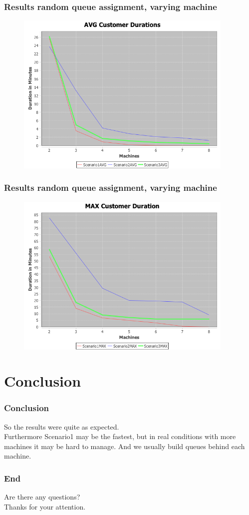 \documentclass{beamer}
\begin{document}
\begin{frame}
\frametitle{Results random queue assignment, varying machine}
\begin{figure}
\centering
\includegraphics[width=0.93\textwidth]{results/Output_AVG_random_true.png}
\end{figure}
\end{frame}

\begin{frame}
\frametitle{Results random queue assignment, varying machine}
\begin{figure}
\centering
\includegraphics[width=0.93\textwidth]{results/Output_MAX_random_true.png}
\end{figure}
\end{frame}

\section{Conclusion}
\begin{frame}
\frametitle{Conclusion}
So the results were quite as expected.\\
Furthermore Scenario1 may be the fastest, but in real conditions with more machines it may be hard to manage. And we usually build queues behind each machine.
\end{frame}

\begin{frame}
\frametitle{End}
Are there any questions? \\
Thanks for your attention.
\end{frame}
\end{document}
